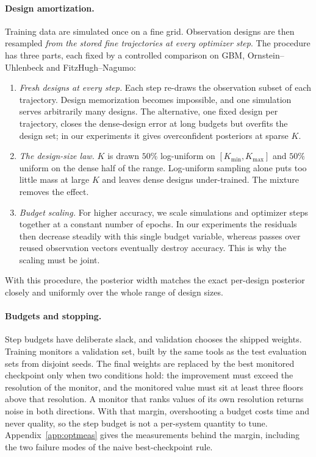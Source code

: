 \documentclass[10pt]{article}
\begin{document}
\paragraph{Design amortization.} Training data are simulated once on a fine grid. Observation designs
are then resampled \emph{from the stored fine trajectories at every optimizer step}. The procedure has
three parts, each fixed by a controlled comparison on GBM, Ornstein--Uhlenbeck and FitzHugh--Nagumo:
\begin{enumerate}
  \item \emph{Fresh designs at every step.} Each step re-draws the observation subset of each
  trajectory. Design memorization becomes impossible, and one simulation serves arbitrarily many
  designs. The alternative, one fixed design per trajectory, closes the dense-design error at long
  budgets but overfits the design set; in our experiments it gives overconfident posteriors at sparse
  $K$.
  \item \emph{The design-size law.} $K$ is drawn $50\%$ log-uniform on $[K_{\min}, K_{\max}]$ and
  $50\%$ uniform on the dense half of the range. Log-uniform sampling alone puts too little mass at
  large $K$ and leaves dense designs under-trained. The mixture removes the effect.
  \item \emph{Budget scaling.} For higher accuracy, we scale simulations and optimizer steps together
  at a constant number of epochs. In our experiments the residuals then decrease steadily with this
  single budget variable, whereas passes over reused observation vectors eventually destroy accuracy.
  This is why the scaling must be joint.
\end{enumerate}
With this procedure, the posterior width matches the exact per-design posterior closely and uniformly
over the whole range of design sizes.

\paragraph{Budgets and stopping.} Step budgets have deliberate slack, and validation chooses the
shipped weights. Training monitors a validation set, built by the same tools as the test evaluation
sets from disjoint seeds. The final weights are replaced by the best monitored checkpoint only when
two conditions hold: the improvement must exceed the resolution of the monitor, and the monitored
value must sit at least three floors above that resolution. A monitor that ranks values of its own
resolution returns noise in both directions. With that margin, overshooting a budget costs time and
never quality, so the step budget is not a per-system quantity to tune. Appendix~\ref{app:optmeas}
gives the measurements behind the margin, including the two failure modes of the naive
best-checkpoint rule.
\end{document}
